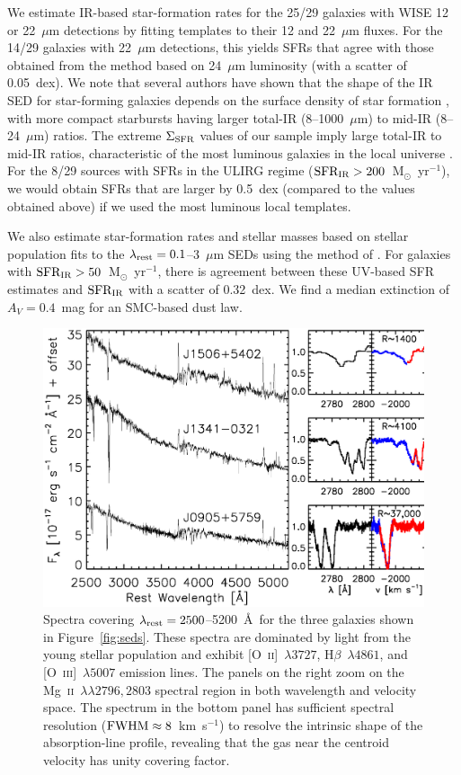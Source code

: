\documentclass[apj]{emulateapj}
\newcommand{\kms}{km~s$^{-1}$}
\newcommand{\mgii}{\textrm{Mg}~\textsc{ii}}
\newcommand{\oii}{[\textrm{O}~\textsc{ii}]}
\newcommand{\oiii}{[\textrm{O}~\textsc{iii}]}
\newcommand{\msun}{M$_{\odot}$}
\newcommand{\lrest}{\lambda_{\textnormal{\scriptsize{rest}}}}
\newcommand{\sigmasfr}{\Sigma_{\textnormal{\scriptsize{SFR}}}}
\newcommand{\sfrir}{\textnormal{SFR}_{\textnormal{\scriptsize{IR}}}}
\begin{document}
We estimate IR-based star-formation rates for the 25/29 galaxies with
WISE 12 or 22~$\mu$m detections by fitting \citet{cha01} templates to
their 12 and 22~$\mu$m fluxes.  For the 14/29 galaxies with 22~$\mu$m
detections, this yields SFRs that agree with those obtained from the
\citet{ruj12} method based on 24~$\mu$m luminosity (with a scatter of
0.05~dex).  We note that several authors have shown that the shape of
the IR SED for star-forming galaxies depends on the surface density of
star formation \citep[e.g.,][]{ruj11,elb11}, with more compact
starbursts having larger total-IR (8--1000~$\mu$m) to mid-IR
(8--24~$\mu$m) ratios.  The extreme $\sigmasfr$ values of our sample
imply large total-IR to mid-IR ratios, characteristic of the most
luminous galaxies in the local universe
\citep[e.g.,][]{cha01,dal02,rie09}.  For the 8/29 sources with SFRs in
the ULIRG regime ($\sfrir>200$~\msun~yr$^{-1}$), we would obtain SFRs
that are larger by 0.5~dex (compared to the values obtained above) if
we used the most luminous local templates.

We also estimate star-formation rates and stellar masses based on
stellar population fits to the $\lrest=0.1$--3~$\mu$m SEDs using the
method of \citet{mou11}.  For galaxies with
$\sfrir>50$~\msun~yr$^{-1}$, there is agreement between these UV-based
SFR estimates and $\sfrir$ with a scatter of 0.32~dex.  We find a
median extinction of $A_V=0.4$~mag for an SMC-based dust law.

\begin{figure}[!t]
\includegraphics[angle=0,scale=0.41]{spectra.ps}
\caption{Spectra covering $\lrest=2500$--5200~\AA\ for the three
  galaxies shown in Figure~\ref{fig:seds}.  These spectra are
  dominated by light from the young stellar population and exhibit
  \oii~$\lambda3727$, H$\beta$~$\lambda4861$, and \oiii~$\lambda5007$
  emission lines.  The panels on the right zoom on the
  \mgii~$\lambda\lambda2796,2803$ spectral region in both wavelength
  and velocity space.  The spectrum in the bottom panel has sufficient
  spectral resolution ($\textnormal{FWHM}\approx8$~\kms) to resolve
  the intrinsic shape of the absorption-line profile, revealing that
  the gas near the centroid velocity has unity covering factor.}
\label{fig:spectra}
\end{figure}
\end{document}

